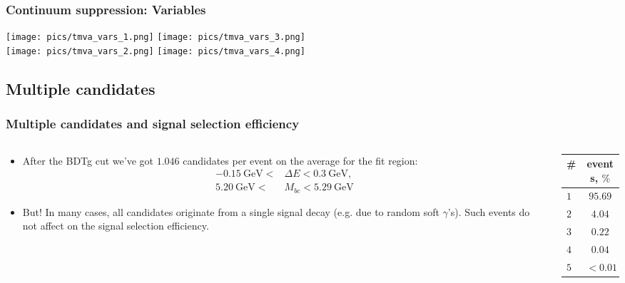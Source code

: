 \documentclass[10 pt,compress,mathserif]{beamer}
\begin{document}
\begin{frame}
 \frametitle{Continuum suppression: Variables}
   \texttt{[image: pics/tmva\_vars\_1.png]} \texttt{[image: pics/tmva\_vars\_3.png]}\\
   \texttt{[image: pics/tmva\_vars\_2.png]} \texttt{[image: pics/tmva\_vars\_4.png]}
\end{frame}

\subsection{Multiple candidates}
\begin{frame}
\frametitle{Multiple candidates and signal selection efficiency} 
\begin{small}
\begin{columns}
 \begin{column}{0.78\textwidth}
 \begin{itemize}
  \item After the BDTg cut we've got $1.046$ candidates per event on the average for the fit region:
  \begin{equation*}
  \begin{split}
   -0.15\ \text{GeV} < &\Delta E < 0.3\ \text{GeV},\\
    5.20\ \text{GeV} < &M_{bc} < 5.29\ \text{GeV}
  \end{split}
  \end{equation*}

  \item But! In many cases, all candidates originate from a single signal decay (e.g. due to random soft $\gamma$'s). Such events do not affect on the signal selection efficiency.
 \end{itemize}
 \end{column}
 \begin{column}{0.22\textwidth}
  \small
   \begin{tabular}{|l|c|} \hline
   \# & events, $\%$ \\ \hline
   $1$ & $95.69$\\ \hline
   $2$ & $4.04$\\ \hline
   $3$ & $0.22$\\ \hline
   $4$ & $0.04$\\ \hline
   $5$ & $<0.01$\\ \hline
   \end{tabular}
  \end{column}
 \end{columns}


\end{small}
\end{frame}
\end{document}

